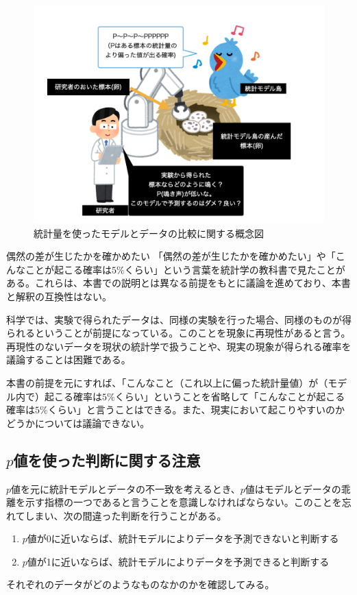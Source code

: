 \begin{figure}
    \begin{center}
        \includegraphics[width=15cm]{./image/01_/conceptual_diagram/conceptual_diagram.003.png}
        \caption{統計量を使ったモデルとデータの比較に関する概念図}
        \label{fig:conceptual_diagram_test}
    \end{center}
\end{figure}
    


\begin{SMbox}{偶然の差が生じたかを確かめたい}
    「偶然の差が生じたかを確かめたい」や「こんなことが起こる確率は$5\%$くらい」という言葉を統計学の教科書で見たことがある。これらは、本書での説明とは異なる前提をもとに議論を進めており、本書と解釈の互換性はない。
    
    科学では、実験で得られたデータは、同様の実験を行った場合、同様のものが得られるということが前提になっている。このことを現象に再現性があると言う。
    再現性のないデータを現状の統計学で扱うことや、現実の現象が得られる確率を議論することは困難である。

    本書の前提を元にすれば、「こんなこと（これ以上に偏った統計量値）が（モデル内で）起こる確率は$5\%$くらい」ということを省略して「こんなことが起こる確率は$5\%$くらい」と言うことはできる。また、現実において起こりやすいのかどうかについては議論できない。
\end{SMbox}


\subsection{$p$値を使った判断に関する注意}
$p$値を元に統計モデルとデータの不一致を考えるとき、$p$値はモデルとデータの乖離を示す指標の一つであると言うことを意識しなければならない。このことを忘れてしまい、次の間違った判断を行うことがある。
\begin{enumerate}
    \item $p$値が0に近いならば、統計モデルによりデータを予測できないと判断する
    \item $p$値が1に近いならば、統計モデルによりデータを予測できると判断する
\end{enumerate}
それぞれのデータがどのようなものなかのかを確認してみる。
